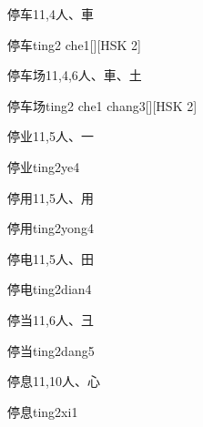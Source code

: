 \begin{Entry}{停车}{11,4}{⼈、⾞}
  \begin{Phonetics}{停车}{ting2 che1}[][HSK 2]
  \end{Phonetics}
\end{Entry}

\begin{Entry}{停车场}{11,4,6}{⼈、⾞、⼟}
  \begin{Phonetics}{停车场}{ting2 che1 chang3}[][HSK 2]
  \end{Phonetics}
\end{Entry}

\begin{Entry}{停业}{11,5}{⼈、⼀}
  \begin{Phonetics}{停业}{ting2ye4}
  \end{Phonetics}
\end{Entry}

\begin{Entry}{停用}{11,5}{⼈、⽤}
  \begin{Phonetics}{停用}{ting2yong4}
  \end{Phonetics}
\end{Entry}

\begin{Entry}{停电}{11,5}{⼈、⽥}
  \begin{Phonetics}{停电}{ting2dian4}
  \end{Phonetics}
\end{Entry}

\begin{Entry}{停当}{11,6}{⼈、⼹}
  \begin{Phonetics}{停当}{ting2dang5}
  \end{Phonetics}
\end{Entry}

\begin{Entry}{停息}{11,10}{⼈、⼼}
  \begin{Phonetics}{停息}{ting2xi1}
  \end{Phonetics}
\end{Entry}

